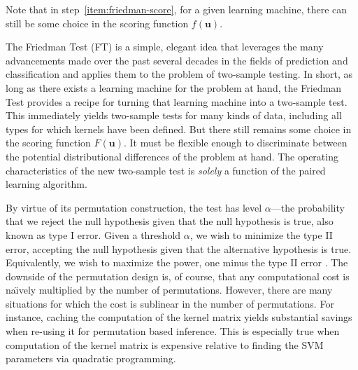 Note that in step~\ref{item:friedman-score}, for a given learning
machine, there can still be some choice in the scoring function
$f(\mathbf{u})$.



The Friedman Test (FT) is a simple, elegant idea that leverages the
many advancements made over the past several decades in the fields of
prediction and classification and applies them to the problem of
two-sample testing.  In short, as long as there exists a learning
machine for the problem at hand, the Friedman Test provides a recipe
for turning that learning machine into a two-sample test.  This
immediately yields two-sample tests for many kinds of data, including
all types for which kernels have been defined.
But there still remains some choice in the scoring
function $F(\mathbf{u})$.  It must be flexible enough to discriminate
between the potential distributional differences of the problem at
hand.  The operating characteristics of the new two-sample test is
\emph{solely} a function of the paired learning algorithm.

By virtue of its permutation construction, the test has level $\alpha$---the
probability that we reject the null hypothesis given
that the null hypothesis is true, also known as type I error.  Given a
threshold $\alpha$, we wish to minimize the type II error, accepting
the null hypothesis given that the alternative hypothesis is true.
Equivalently, we wish to maximize the power, one minus the type II
error \cite{lehmann2005testing}.  The downside of the permutation
design is, of course, that any computational cost is na\"\i vely
multiplied by the number of permutations.  However, there are many
situations for which the cost is sublinear in the number of
permutations.  For instance, caching the computation of the kernel matrix
yields substantial savings when re-using it for permutation based
inference.  This is especially true when computation of the kernel
matrix is expensive relative to finding the SVM parameters via
quadratic programming.


